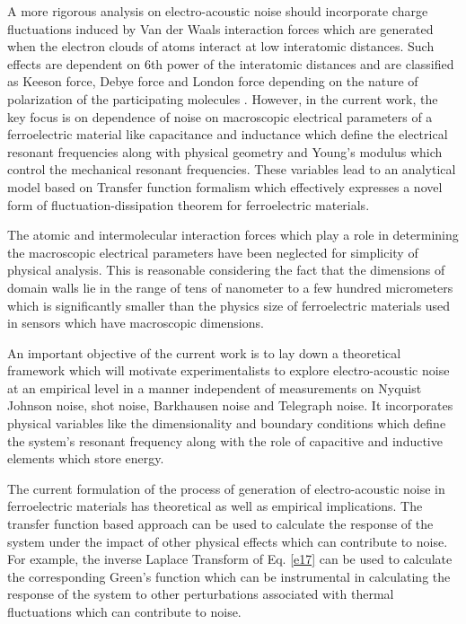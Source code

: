\documentclass[12pt,column,showpacs,pre,preprintnumbers,amsmath,amssymb,aps,standalone]{revtex4-2}
\begin{document}
 	
 	A more rigorous analysis on electro-acoustic noise should incorporate charge fluctuations induced by Van der Waals interaction forces which are generated when the electron clouds of atoms interact at low interatomic distances. Such effects are dependent on 6th power of the interatomic distances and are classified as Keeson force, Debye force and London force depending on the nature of polarization of the participating molecules \cite{35}. However, in the current work, the key focus is on dependence of noise on macroscopic electrical  parameters of a ferroelectric material like capacitance and inductance which define the electrical resonant frequencies along with physical geometry and Young's modulus which control the mechanical resonant frequencies. These variables lead to an analytical model based on Transfer function formalism which effectively expresses a novel form of fluctuation-dissipation theorem for ferroelectric materials.
 
 The atomic and intermolecular interaction forces which play a role in determining the macroscopic electrical parameters have been neglected for simplicity of physical analysis. This is reasonable considering the fact that the dimensions of domain walls lie in the range of tens of nanometer \cite{36} to  a few hundred micrometers\cite{37} which is significantly smaller than the physics size of ferroelectric materials used in sensors which have macroscopic dimensions.
 	
 
  An important objective of the current work is to lay down a theoretical framework which will motivate experimentalists to explore electro-acoustic noise at an empirical level in a manner independent of measurements on Nyquist Johnson noise, shot noise, Barkhausen noise and Telegraph noise. It incorporates physical variables like the dimensionality and boundary conditions which define the system's resonant frequency along with the role of capacitive and inductive elements which store energy.
  
The current formulation of the process of generation of electro-acoustic noise in ferroelectric materials has theoretical as well as empirical implications. The transfer function based approach can be used to calculate the response of the system under the impact of other physical effects which can contribute to noise. For example, the inverse Laplace Transform of Eq. \ref{e17} can be used to calculate the corresponding Green's function which can be instrumental in calculating the response of the system to other perturbations associated with thermal fluctuations which can contribute to noise.
\end{document}
